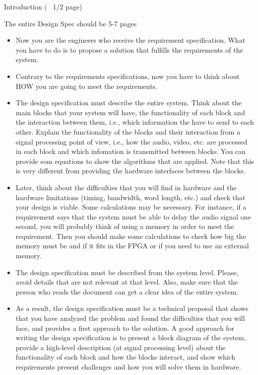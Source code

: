Introduction (~ 1/2 page)

The entire Design Spec should be 5-7 pages

\begin{itemize}
\item Now you are the engineers who receive the requirement specification. What you have to do is to propose a solution that fulfills the requirements of the system.
\item Contrary to the requirements specifications, now you have to think about HOW you are going to meet  the requirements.
\item The design specification must describe the entire system. Think about the main blocks that your system will have, the functionality of each block and the interaction between them, i.e., which information the have to send to each other. Explain the functionality of the blocks and their interaction from a signal processing point of view, i.e., how the audio, video, etc. are processed in each block and which infomation is transmitted between blocks. You can provide som equations to show the algorithms that are applied. Note that this is very different from providing the hardware interfaces between the blocks.
\item Later, think about the difficulties that you will find in hardware and the hardware limitations (timing, bandwidth, word length, etc.) and check that your design is viable. Some calculations may be necessary. For instance, if a requirrement says that the system must be able to delay the audio signal one second, you will probably think of using a memory in order to meet the requirement. Then you should make some calculations to check how big the memory must be and if it fits in the FPGA or if you need to use an external memory.
\item The design specification must be described from the system level. Please, avoid details that are not relevant at that level. Also, make sure that the person who reads the document can get a clear idea of the entire system.
\item As a result, the design specification must be a technical proposal that shows that you have analyzed the problem and found the difficulties that you will face, and provides a first approach to the solution. A good approach for writing the design specification is to present a block diagram of the system, provide a high-level description (at signal processing level) about the functionality of each block and how the blocks interact, and show which requirements present challenges and how you will solve them in hardware.
\end{itemize}

